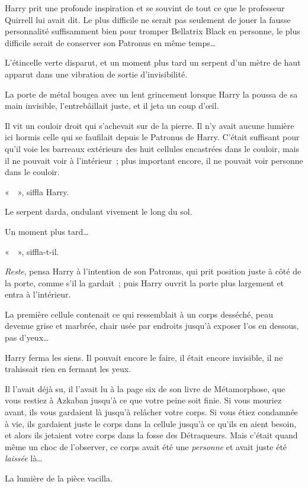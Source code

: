 Harry prit une profonde inspiration et se souvint de tout ce que le professeur Quirrell lui avait dit. Le plus difficile ne serait pas seulement de jouer la fausse personnalité suffisamment bien pour tromper Bellatrix Black en personne, le plus difficile serait de conserver son Patronus en même temps…

L'étincelle verte disparut, et un moment plus tard un serpent d'un mètre de haut apparut dans une vibration de sortie d'invisibilité.

La porte de métal bougea avec un lent grincement lorsque Harry la poussa de sa main invisible, l'entrebâillait juste, et il jeta un coup d'œil.

Il vit un couloir droit qui s'achevait sur de la pierre. Il n'y avait aucune lumière ici hormis celle qui se faufilait depuis le Patronus de Harry. C'était suffisant pour qu'il voie les barreaux extérieurs des huit cellules encastrées dans le couloir, mais il ne pouvait voir à l'intérieur~; plus important encore, il ne pouvait voir personne dans le couloir.

«~~», siffla Harry.

Le serpent darda, ondulant vivement le long du sol.

Un moment plus tard…

«~~», siffla-t-il.

\emph{Reste}, pensa Harry à l'intention de son Patronus, qui prit position juste à côté de la porte, comme s'il la gardait~; puis Harry ouvrit la porte plus largement et entra à l'intérieur.

La première cellule contenait ce qui ressemblait à un corps desséché, peau devenue grise et marbrée, chair usée par endroits jusqu'à exposer l'os en dessous, pas d'yeux…

Harry ferma les siens. Il pouvait encore le faire, il était encore invisible, il ne trahissait rien en fermant les yeux.

Il l'avait déjà su, il l'avait lu à la page six de son livre de Métamorphose, que vous restiez à Azkaban jusqu'à ce que votre peine soit finie. Si vous mouriez avant, ils vous gardaient là jusqu'à relâcher votre corps. Si vous étiez condamnée à vie, ils gardaient juste le corps dans la cellule jusqu'à ce qu'ils en aient besoin, et alors ils jetaient votre corps dans la fosse des Détraqueurs. Mais c'était quand même un choc de l'observer, ce corps avait été une \emph{personne} et avait juste été \emph{laissée} là…

La lumière de la pièce vacilla.


